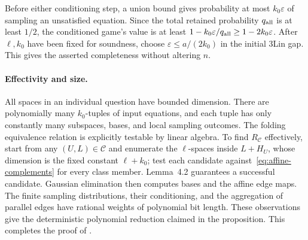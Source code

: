 Before either conditioning step, a union bound gives probability at most
$k_0\varepsilon$ of sampling an unsatisfied equation.  Since the
total retained probability $q_{\rm all}$ is at least $1/2$, the
conditioned game's value is at least
$1-k_0\varepsilon/q_{\rm all}\ge1-2k_0\varepsilon$.
After $\ell,k_0$ have been fixed for
soundness, choose $\varepsilon\leq a/(2k_0)$ in the initial 3Lin
gap.  This gives the asserted completeness without altering $n$.

\paragraph{Effectivity and size.}
All spaces in an individual question have bounded dimension.  There
are polynomially many $k_0$-tuples of input equations, and each tuple
has only constantly many subspaces, bases, and local sampling
outcomes.  The folding equivalence relation is explicitly testable
by linear algebra.  To find $R_{\mathcal C}$ effectively, start from
any $(U,L)\in\mathcal C$ and enumerate the $\ell$-spaces inside
$L+H_U$, whose dimension is the fixed constant $\ell+k_0$; test each
candidate against~\eqref{eq:affine-complements} for every class
member.  Lemma~4.2 guarantees a successful candidate.  Gaussian
elimination then computes bases and the affine edge maps.
The finite sampling distributions, their conditioning, and the
aggregation of parallel edges have rational weights of polynomial
bit length.  These observations give the deterministic polynomial
reduction claimed in the proposition.
This completes the proof of .
